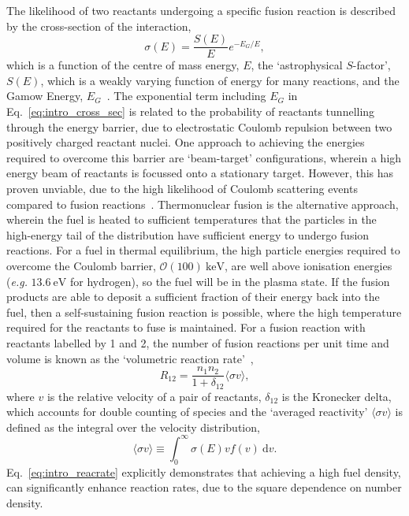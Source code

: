 The likelihood of two reactants undergoing a specific fusion reaction is described by the cross-section of the interaction,
\begin{equation}
    \label{eq:intro_cross_sec}
    \sigma(E) = \frac{S(E)}{E} e^{-E_G/E},
\end{equation}
which is a function of the centre of mass energy, $E$, the `astrophysical $S$-factor', $S(E)$, which is a weakly varying function of energy for many reactions, and the Gamow Energy, $E_G$~\cite{atzeni_physics_2004}.
The exponential term including $E_G$ in Eq.~\ref{eq:intro_cross_sec} is related to the probability of reactants tunnelling through the energy barrier, due to electrostatic Coulomb repulsion between two positively charged reactant nuclei.
One approach to achieving the energies required to overcome this barrier are `beam-target' configurations, wherein a high energy beam of reactants is focussed onto a stationary target.
However, this has proven unviable, due to the high likelihood of Coulomb scattering events compared to fusion reactions~\cite{rider_general_1995}.
Thermonuclear fusion is the alternative approach, wherein the fuel is heated to sufficient temperatures that the particles in the high-energy tail of the distribution have sufficient energy to undergo fusion reactions.
For a fuel in thermal equilibrium, the high particle energies required to overcome the Coulomb barrier, $\mathcal{O}(100)\ \text{keV}$, are well above ionisation energies (\textit{e.g. }$13.6\ \text{eV}$ for hydrogen), so the fuel will be in the plasma state.
If the fusion products are able to deposit a sufficient fraction of their energy back into the fuel, then a self-sustaining fusion reaction is possible, where the high temperature required for the reactants to fuse is maintained.
For a fusion reaction with reactants labelled by 1 and 2, the number of fusion reactions per unit time and volume is known as the `volumetric reaction rate'~\cite{atzeni_physics_2004},
\begin{equation}
    \label{eq:intro_reacrate}
    R_{12} = \frac{n_1 n_2}{1+\delta_{12}} \langle \sigma v \rangle,
\end{equation}
where $v$ is the relative velocity of a pair of reactants, $\delta_{12}$ is the Kronecker delta, which accounts for double counting of species and the `averaged reactivity' $\langle \sigma v \rangle$ is defined as the integral over the velocity distribution,
\begin{equation}
    \label{eq:intro_reactivity}
    \langle \sigma v \rangle \equiv \int_0^{\infty} \sigma(E) v f(v)\ \text{d}v.
\end{equation}
Eq.~\ref{eq:intro_reacrate} explicitly demonstrates that achieving a high fuel density, can significantly enhance reaction rates, due to the square dependence on number density.

